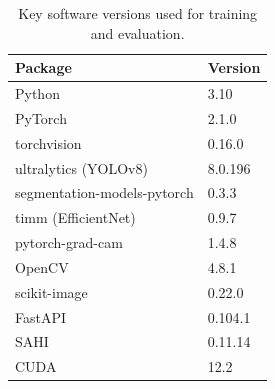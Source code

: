 \documentclass[12pt,a4paper]{article}
\begin{document}
\begin{table}[H]
\centering
\caption{Key software versions used for training and evaluation.}
\label{tab:software}
\begin{tabular}{ll}
\toprule
\rowcolor{white}
\textbf{Package} & \textbf{Version} \\
\midrule
Python & 3.10 \\
PyTorch & 2.1.0 \\
torchvision & 0.16.0 \\
ultralytics (YOLOv8) & 8.0.196 \\
segmentation-models-pytorch & 0.3.3 \\
timm (EfficientNet) & 0.9.7 \\
pytorch-grad-cam & 1.4.8 \\
OpenCV & 4.8.1 \\
scikit-image & 0.22.0 \\
FastAPI & 0.104.1 \\
SAHI & 0.11.14 \\
CUDA & 12.2 \\
\bottomrule
\end{tabular}
\end{table}
\end{document}
